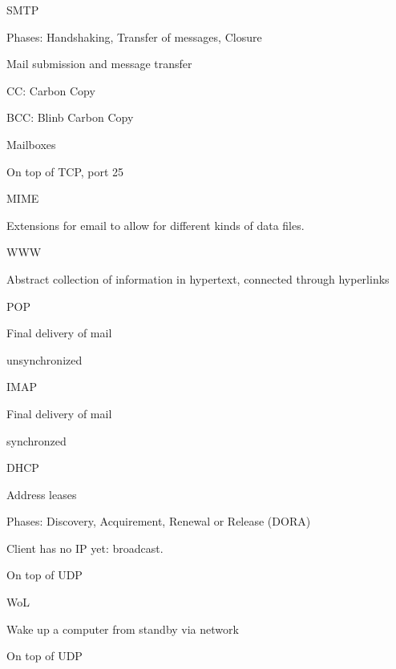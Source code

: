 \documentclass[main.tex]{subfiles}
\begin{document}
\begin{card}{SMTP}
\item Phases: Handshaking, Transfer  of  messages, Closure
\item Mail submission and message transfer
\item CC: Carbon Copy
\item BCC: Blinb Carbon Copy
\item Mailboxes
\item On top of TCP, port 25
\end{card}

\begin{card}{MIME}
\item Extensions for email to allow for different kinds of data files.
\end{card}

\begin{card}{WWW}
\item Abstract collection of information in hypertext, connected through hyperlinks
\end{card}

\begin{card}{POP}
\item Final delivery of mail
\item unsynchronized
\end{card}

\begin{card}{IMAP}
\item Final delivery of mail
\item synchronzed
\end{card}

\begin{card}{DHCP}
\item Address leases
\item Phases: Discovery, Acquirement, Renewal or Release (DORA)
\item Client has no IP yet: broadcast.
\item On top of UDP
\end{card}

\begin{card}{WoL}
\item Wake up a computer from standby via network
\item On top of UDP
\end{card}
\end{document}

